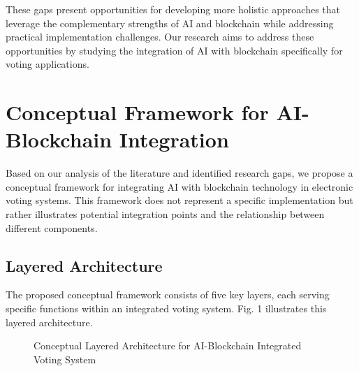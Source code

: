 \documentclass[conference]{IEEEtran}
\begin{document}
These gaps present opportunities for developing more holistic approaches that leverage the complementary strengths of AI and blockchain while addressing practical implementation challenges. Our research aims to address these opportunities by studying the integration of AI with blockchain specifically for voting applications.

\section{Conceptual Framework for AI-Blockchain Integration}
Based on our analysis of the literature and identified research gaps, we propose a conceptual framework for integrating AI with blockchain technology in electronic voting systems. This framework does not represent a specific implementation but rather illustrates potential integration points and the relationship between different components.

\subsection{Layered Architecture}
The proposed conceptual framework consists of five key layers, each serving specific functions within an integrated voting system. Fig. 1 illustrates this layered architecture.

\begin{figure}[!h]
\centering
{}
\caption{Conceptual Layered Architecture for AI-Blockchain Integrated Voting System}
\label{fig:architecture}
\end{figure}
\end{document}
